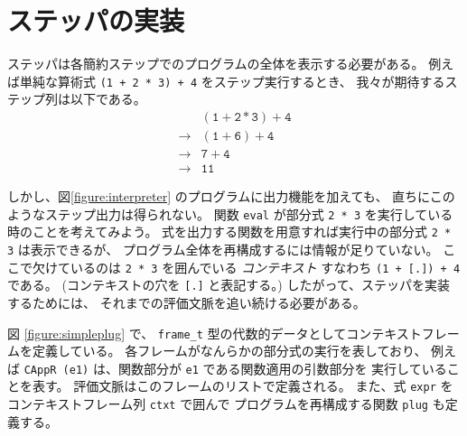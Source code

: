\section{ステッパの実装}
\label{section:try-with__stepper}

ステッパは各簡約ステップでのプログラムの全体を表示する必要がある。
例えば単純な算術式 \texttt{(1 + 2 * 3) + 4} をステップ実行するとき、
我々が期待するステップ列は以下である。
\[
\begin{array}{cl}
            & \mathtt{(1 + 2 * 3) + 4} \\
\rightarrow & \mathtt{(1 + 6) + 4} \\
\rightarrow & \mathtt{7 + 4} \\
\rightarrow & \mathtt{11}
\end{array}
\]

しかし、図\ref{figure:interpreter} のプログラムに出力機能を加えても、
直ちにこのようなステップ出力は得られない。
関数 \texttt{eval} が部分式 \texttt{2 * 3} を実行している時のことを考えてみよう。
式を出力する関数を用意すれば実行中の部分式 \texttt{2 * 3} は表示できるが、
プログラム全体を再構成するには情報が足りていない。
ここで欠けているのは \texttt{2 * 3} を囲んでいる \emph{コンテキスト} すなわち
\texttt{(1 + [.])\ + 4} である。
(コンテキストの穴を \texttt{[.]} と表記する。)
したがって、ステッパを実装するためには、
それまでの評価文脈を追い続ける必要がある。

図 \ref{figure:simpleplug} で、 \texttt{frame\_t} 型の代数的データとしてコンテキストフレームを定義している。
各フレームがなんらかの部分式の実行を表しており、
例えば \texttt{CAppR (e1)} は、関数部分が \texttt{e1} である関数適用の引数部分を
実行していることを表す。
評価文脈はこのフレームのリストで定義される。
また、式 \texttt{expr} をコンテキストフレーム列 \texttt{ctxt} で囲んで
プログラムを再構成する関数 \texttt{plug} も定義する。

